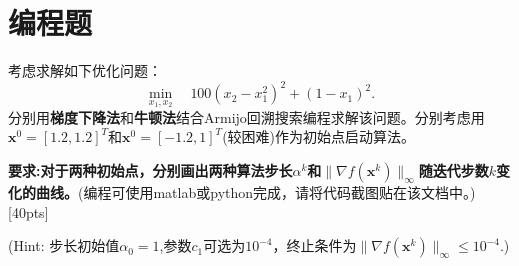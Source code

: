 \documentclass[10pt]{article}
\begin{document}
\section{编程题}
考虑求解如下优化问题：
\begin{equation}\label{f.rosen}
\min_{x_1, x_2} \quad 100(x_2 - x_1^2)^2 + (1-x_1)^2.
\end{equation}
分别用\textbf{梯度下降法}和\textbf{牛顿法}结合Armijo回溯搜索编程求解该问题。分别考虑用$\bm{x}^0=[1.2, 1.2]^T$和$\bm{x}^0=[-1.2, 1]^T$(较困难)作为初始点启动算法。

\textbf{要求:对于两种初始点，分别画出两种算法步长$\alpha^k$和$\|\nabla f(\bm{x}^k)\|_\infty$随迭代步数$k$变化的曲线。}({\color{red}编程可使用matlab或python完成，请将代码截图贴在该文档中。}) {\color{red}[40pts]}

(Hint: 步长初始值$\alpha_0=1$,参数$c_1$可选为$10^{-4}$，终止条件为$\|\nabla f(\bm{x}^k)\|_\infty\le 10^{-4}$.)
\end{document}
